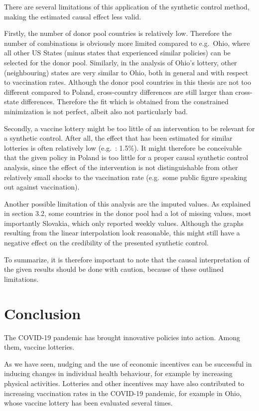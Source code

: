 \documentclass{scrbook}
\begin{document}
There are several limitations of this application of the synthetic
control method, making the estimated causal effect less valid.

Firstly, the number of donor pool countries is relatively low. Therefore
the number of combinations is obviously more limited compared to
e.g.~Ohio, where all other US States (minus states that experienced
similar policies) can be selected for the donor pool. Similarly, in the
analysis of Ohio's lottery, other (neighbouring) states are very similar
to Ohio, both in general and with respect to vaccination rates. Although
the donor pool countries in this thesis are not too different compared
to Poland, cross-country differences are still larger than cross-state
differences. Therefore the fit which is obtained from the constrained
minimization is not perfect, albeit also not particularly bad.

Secondly, a vaccine lottery might be too little of an intervention to be
relevant for a synthetic control. After all, the effect that has been
estimated for similar lotteries is often relatively low
(e.g.~\textcite{barber_conditional_2022}: 1.5\%). It might therefore be
conceivable that the given policy in Poland is too little for a proper
causal synthetic control analysis, since the effect of the intervention
is not distinguishable from other relatively small shocks to the
vaccination rate (e.g.~some public figure speaking out against
vaccination).

Another possible limitation of this analysis are the imputed values. As
explained in section 3.2, some countries in the donor pool had a lot of
missing values, most importantly Slovakia, which only reported weekly
values. Although the graphs resulting from the linear interpolation look
reasonable, this might still have a negative effect on the credibility
of the presented synthetic control.

To summarize, it is therefore important to note that the causal
interpretation of the given results should be done with caution, because
of these outlined limitations.

\chapter{Conclusion}

The COVID-19 pandemic has brought innovative policies into action. Among
them, vaccine lotteries.

As we have seen, nudging and the use of economic incentives can be
successful in inducing changes in individual health behaviour, for
example by increasing physical activities. Lotteries and other
incentives may have also contributed to increasing vaccination rates in
the COVID-19 pandemic, for example in Ohio, whose vaccine lottery has
been evaluated several times.
\end{document}
